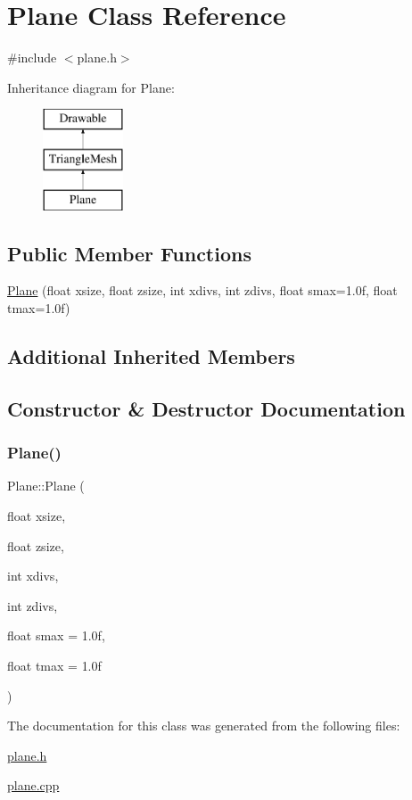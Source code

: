 \hypertarget{class_plane}{}\section{Plane Class Reference}
\label{class_plane}


{\ttfamily \#include $<$plane.\+h$>$}

Inheritance diagram for Plane\+:\begin{figure}[H]
\begin{center}
\leavevmode
\includegraphics[height=3.000000cm]{class_plane}
\end{center}
\end{figure}
\subsection*{Public Member Functions}
\begin{DoxyCompactItemize}
\item 
\mbox{\hyperlink{class_plane_aec8b8167110373d9dbbd8f67f3100cf4}{Plane}} (float xsize, float zsize, int xdivs, int zdivs, float smax=1.\+0f, float tmax=1.\+0f)
\end{DoxyCompactItemize}
\subsection*{Additional Inherited Members}


\subsection{Constructor \& Destructor Documentation}
\mbox{\label{class_plane_aec8b8167110373d9dbbd8f67f3100cf4}} 
\subsubsection{\texorpdfstring{Plane()}{Plane()}}
{\footnotesize\ttfamily Plane\+::\+Plane (\begin{DoxyParamCaption}\item[{float}]{xsize,  }\item[{float}]{zsize,  }\item[{int}]{xdivs,  }\item[{int}]{zdivs,  }\item[{float}]{smax = {\ttfamily 1.0f},  }\item[{float}]{tmax = {\ttfamily 1.0f} }\end{DoxyParamCaption})}



The documentation for this class was generated from the following files\+:\begin{DoxyCompactItemize}
\item 
\mbox{\hyperlink{plane_8h}{plane.\+h}}\item 
\mbox{\hyperlink{plane_8cpp}{plane.\+cpp}}\end{DoxyCompactItemize}
